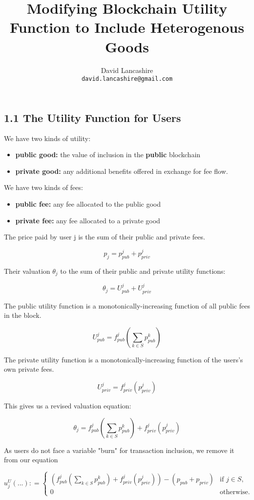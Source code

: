 \documentclass[oneside]{article}   	%
\title{Modifying Blockchain Utility Function to Include Heterogenous Goods}
\author{
  David Lancashire\\
  \texttt{david.lancashire@gmail.com}\\
}
\begin{document}
\maketitle

\subsection*{1.1 The Utility Function for Users}

We have two kinds of utility:

\begin{itemize}
  \item \textbf{public good:} the value of inclusion in the \textbf{public} blockchain
  \item \textbf{private good:} any additional benefits offered in exchange for fee flow.
\end{itemize}

We have two kinds of fees:

\begin{itemize}
  \item \textbf{public fee:} any fee allocated to the public good
  \item \textbf{private fee:} any fee allocated to a private good
\end{itemize}

The price paid by user j is the sum of their public and private fees.

$$
p_j = p_{pub}^j + p_{priv}^j
$$

Their valuation $\theta_j$ to the sum of their public and private utility functions:

$$
\theta_j = U_{pub}^j + U_{priv}^j
$$

The public utility function is a monotonically-increasing function of all public fees in the block.

$$
U_{pub}^j = f_{pub}^j\left(\sum_{k \in S} p_{pub}^{k}\right)
$$

The private utility function is a monotonically-increasing function of the users's own private fees.

$$
U_{priv}^j = f_{priv}^j(p_{priv}^j)
$$

This gives us a revised valuation equation:

$$
\theta_j = f_{pub}^j\left(\sum_{k \in S} p_{pub}^{k}\right) + f_{priv}^j(p_{priv}^j)
$$

As users do not face a variable "burn" for transaction inclusion, we remove it from our equation

\[
u_j^U\left(...\right) : =
\begin{cases}
\left(
	f_{pub}^j
		\left(\sum_{k \in S} p_{pub}^{k}\right) 
		+ f_{priv}^j(p_{priv}^j) 
\right)  -   \left(p_{pub} + p_{priv}\right) & \text{if } j \in S, \\ 0 & \text{otherwise.}
\end{cases}
\]
\end{document}
